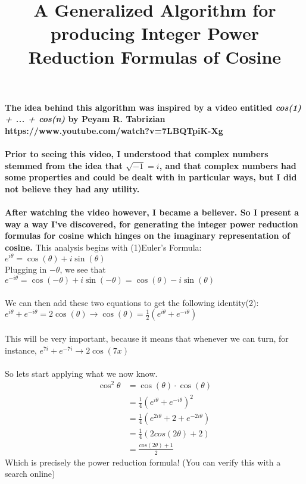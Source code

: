 \documentclass[12pt]{article}
\title{A Generalized Algorithm for producing Integer Power Reduction Formulas
of Cosine}
\begin{document}
\maketitle
\noindent \textbf{The idea behind this algorithm was inspired by a video 
entitled \textit{cos(1) + ... + cos(n)} by Peyam R. Tabrizian}
\\
\textbf{https://www.youtube.com/watch?v=7LBQTpiK-Xg}
\\
\\
\textbf{Prior to seeing this video, I understood that complex numbers stemmed from
the idea that $\sqrt{-1} = i$, and that complex numbers had some properties and
could be dealt with in particular ways, but I did not believe they had any utility.}
\\
\\
\textbf{After watching the video however, I became a believer. So I present a way
a way I've discovered, for generating the integer power reduction formulas for cosine which hinges on the imaginary representation of cosine.}
\newpage
\noindent This analysis begins with (1)Euler's Formula:
$e^{i\theta} = \cos(\theta) + i\sin(\theta)$
\\
Plugging in $-\theta$, we see that 
$e^{-i\theta} = \cos(-\theta) + i\sin(-\theta) = \cos(\theta) - i\sin(\theta)$
\\
\\
We can then add these two equations to get the following identity(2):
\\
$e^{i\theta} + e^{-i\theta} = 2\cos(\theta) \to 
\cos(\theta) = \frac{1}{2}(e^{i\theta} + e^{-i\theta})$
\\
\\
This will be very important, because it means that whenever we can turn, for instance, $e^{7i} + e^{-7i} \to 2\cos(7x)$
\\
\\
So lets start applying what we now know.
\begin{align}
\cos^2\theta &= \cos(\theta) \cdot \cos(\theta) 
\\
&= \frac{1}{4}(e^{i\theta} + e^{-i\theta})^2
\\
&= \frac{1}{4}(e^{2i\theta} + 2 + e^{-2i\theta})
\\
&= \frac{1}{4}(2cos(2\theta) + 2)
\\
&= \frac{cos(2\theta) + 1}{2}
\end{align}
Which is precisely the power reduction formula! (You can verify this with a search online)
\end{document}
